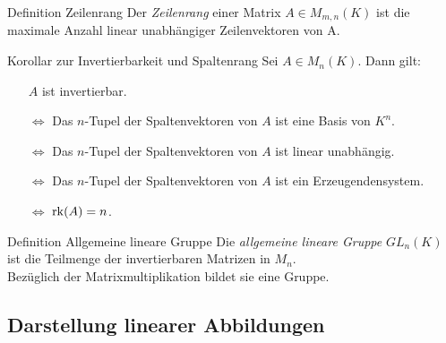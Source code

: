 \documentclass[main.tex]{subfiles}
\begin{document}
\begin{karte}{Definition Zeilenrang}
    Der \textit{Zeilenrang} einer Matrix \(A \in M_{m,n}(K)\) ist 
    die maximale Anzahl linear unabhängiger Zeilenvektoren von A.
\end{karte}
\begin{karte}{Korollar zur Invertierbarkeit und Spaltenrang}
    Sei \(A \in M_n(K)\). Dann gilt:
    \begin{itemize}
        \item[] \(A\) ist invertierbar.
        \item[\(\Leftrightarrow \)] Das \(n\)-Tupel der 
        Spaltenvektoren von \(A\) ist eine Basis von \(K^n\).
        \item[\(\Leftrightarrow \)] Das \(n\)-Tupel der 
        Spaltenvektoren von \(A\) ist linear unabhängig.
        \item[\(\Leftrightarrow \)] Das \(n\)-Tupel der 
        Spaltenvektoren von \(A\) ist ein Erzeugendensystem. 
        \item[\(\Leftrightarrow \)] \(\operatorname{rk}(A) = n\).        
    \end{itemize}
\end{karte}
\begin{karte}{Definition Allgemeine lineare Gruppe}
    Die \textit{allgemeine lineare Gruppe} \(GL_n(K)\) ist die Teilmenge 
    der invertierbaren Matrizen in \(M_n\). \\ 
    Bezüglich der Matrixmultiplikation bildet sie eine Gruppe.
\end{karte}

\subsection*{Darstellung linearer Abbildungen}  
\end{document}
